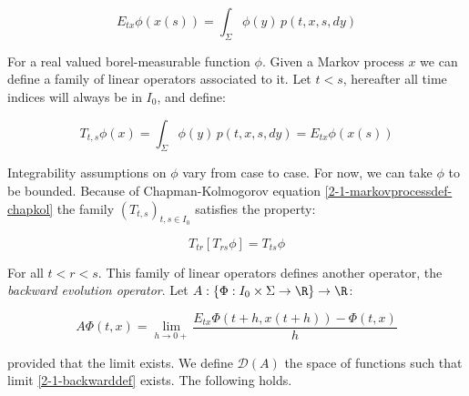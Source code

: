 \begin{equation}
    E_{tx}\phi(x(s)) = \int_{\Sigma} \phi(y)\,p(t,x,s,dy) 
\end{equation}

For a real valued borel-measurable function $\phi$. Given a Markov process $x$ we can define a family of 
linear operators associated to it. Let $t<s$, hereafter all time indices will always be in $I_0$, and define:

\begin{equation}
    T_{t,s}\phi(x) = \int_{\Sigma} \phi(y)\,p(t,x,s,dy) = E_{tx}\phi(x(s))
\end{equation}

Integrability assumptions on $\phi$ vary from case to case. For now, we can take $\phi$ to be bounded. 
Because of Chapman-Kolmogorov equation \ref{2-1-markovprocessdef-chapkol} the family $(T_{t,s})_{t,s\in I_0}$ 
satisfies the property:

\begin{equation}\label{2-1-propT}
    T_{tr}\left[T_{rs}\phi\right] = T_{ts}\phi
\end{equation}

For all $t<r<s$. This family of linear operators defines another operator, the \textit{backward evolution operator}.
Let $A:\left\{\Phi:I_0\times\Sigma\rightarrow\R\right\}\rightarrow \R$:

\begin{equation}\label{2-1-backwarddef}
    A\Phi(t,x) = \lim_{h\to0+} \frac{E_{tx}\Phi(t+h,x(t+h))-\Phi(t,x)}{h}
\end{equation}

provided that the limit exists. We define $\mathcal{D}(A)$ the space of functions such that limit \ref{2-1-backwarddef} exists. 
The following holds.

